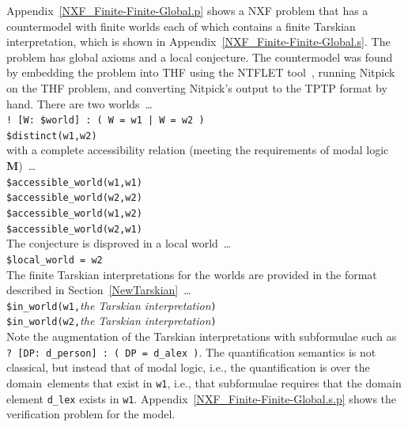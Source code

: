 \documentclass{easychair}
\newcommand{\smalltt}[1]{\small \texttt{#1}}
\begin{document}
Appendix~\ref{NXF_Finite-Finite-Global.p} shows a NXF problem that has a countermodel with
finite worlds each of which contains a finite Tarskian interpretation, which is shown in
Appendix~\ref{NXF_Finite-Finite-Global.s}.
The problem has global axioms and a local conjecture.
The countermodel was found by embedding the problem into THF using the NTFLET 
tool~\cite{Ste22,Ste23}, running Nitpick on the THF problem, and converting Nitpick's output
to the TPTP format by hand.
There are two worlds~\ldots \\
\hspace*{0.5cm}\smalltt{!\,[W:\,\$world]\,:\,(\,W\,=\,w1\,|\,W\,=\,w2\,)} \\
\hspace*{0.5cm}\smalltt{\$distinct(w1,w2)} \\
with a complete accessibility relation (meeting the requirements of modal logic 
\textbf{M})~\ldots \\
\hspace*{0.5cm}\smalltt{\$accessible\_world(w1,w1)} \\
\hspace*{0.5cm}\smalltt{\$accessible\_world(w2,w2)} \\
\hspace*{0.5cm}\smalltt{\$accessible\_world(w1,w2)} \\
\hspace*{0.5cm}\smalltt{\$accessible\_world(w2,w1)} \\
The conjecture is disproved in a local world~\ldots \\
\hspace*{0.5cm}\smalltt{\$local\_world = w2} \\
The finite Tarskian interpretations for the worlds are provided in the format described in 
Section~\ref{NewTarskian}~\ldots \\
\hspace*{0.5cm}\smalltt{\$in\_world(w1,}\emph{the Tarskian interpretation}{\tt )} \\
\hspace*{0.5cm}\smalltt{\$in\_world(w2,}\emph{the Tarskian interpretation}{\tt )} \\
Note the augmentation of the Tarskian interpretations with subformulae such as 
{\tt ?\,[DP:\,d\_person]\,:\,(\,DP\,=\,d\_alex\,)}.
The quantification semantics is not classical, but instead that of modal logic, i.e., the 
quantification is over the domain elements that exist in {\tt w1}, i.e., that subformulae requires 
that the domain element {\tt d\_lex} exists in {\tt w1}.
Appendix~\ref{NXF_Finite-Finite-Global.s.p} shows the verification problem for the model.
\end{document}
